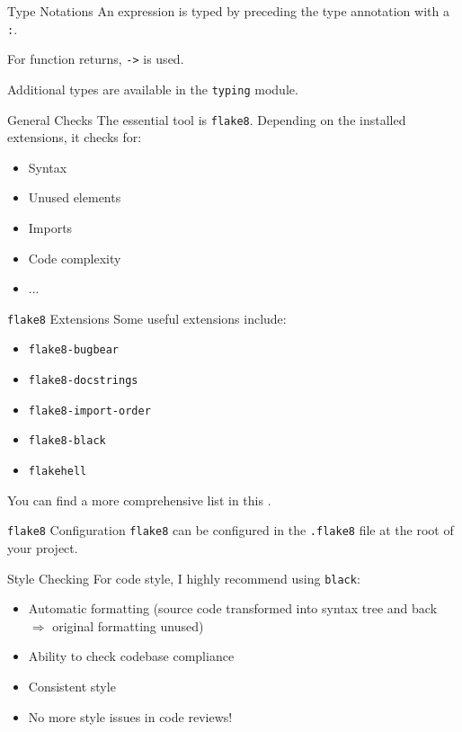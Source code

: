 \begin{frame}{Type Notations}
  An expression is typed by preceding the type annotation with a \texttt{:}.
  
  For function returns, \texttt{->} is used.
  
  
  Additional types are available in the \texttt{typing} module.
\end{frame}

\begin{frame}{General Checks}
  The essential tool is \texttt{flake8}. Depending on the installed extensions, it checks for:
  
  \begin{itemize}
    \item Syntax
    \item Unused elements
    \item Imports
    \item Code complexity
    \item ...
  \end{itemize}
\end{frame}

\begin{frame}{\texttt{flake8} Extensions}
  Some useful extensions include:
  
  \begin{itemize}
    \item \texttt{flake8-bugbear}
    \item \texttt{flake8-docstrings}
    \item \texttt{flake8-import-order}
    \item \texttt{flake8-black}
    \item \texttt{flakehell}
  \end{itemize}
  
  You can find a more comprehensive list in this .
\end{frame}

\begin{frame}{\texttt{flake8} Configuration}
  \texttt{flake8} can be configured in the \texttt{.flake8} file at the root of your project.
  
\end{frame}

\begin{frame}{Style Checking}
  For code style, I highly recommend using \texttt{black}:
  
  \begin{itemize}
    \item Automatic formatting (source code transformed into syntax tree and back $\Rightarrow$ original formatting unused)
    \item Ability to check codebase compliance
    \item Consistent style
    \item No more style issues in code reviews!
 

 \end{itemize}
\end{frame}

